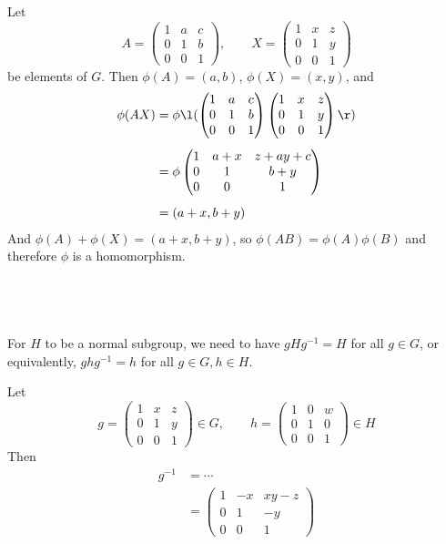 \documentclass[a4paper]{article}
\begin{document}
Let \[ A = \begin{pmatrix}
    1 & a & c \\
    0 & 1 & b \\
    0 & 0 & 1
\end{pmatrix}, \qquad
X = \begin{pmatrix}
    1 & x & z \\
    0 & 1 & y \\
    0 & 0 & 1
\end{pmatrix}
\] be elements of $G$. Then $\phi(A) = (a, b)$, $\phi(X) = (x, y)$, and
\begin{align*}
\phi(AX) &= \phi \l( \begin{pmatrix}
    1 & a & c \\
    0 & 1 & b \\
    0 & 0 & 1
\end{pmatrix}
\begin{pmatrix}
    1 & x & z \\
    0 & 1 & y \\
    0 & 0 & 1
\end{pmatrix} \r) \\[1ex]
&= \phi \begin{pmatrix}
    1 & a + x & z + ay + c \\
    0 & 1 & b + y \\
    0 & 0 & 1
\end{pmatrix} \\[1ex]
&= (a + x, b + y)%
\end{align*}
And $\phi(A) + \phi(X) = (a + x, b + y)$, so $\phi(AB) = \phi(A)\phi(B)$ and therefore $\phi$ is a homomorphism.

\subsection{~} %

For $H$ to be a normal subgroup, we need to have $gHg^{-1} = H$ for all $g \in G$, or equivalently, $ghg^{-1} = h$ for all $g \in G, h \in H$.

Let \[ g = \begin{pmatrix}
    1 & x & z \\
    0 & 1 & y \\
    0 & 0 & 1
\end{pmatrix} \in G, \qquad
h = \begin{pmatrix}
    1 & 0 & w \\
    0 & 1 & 0 \\
    0 & 0 & 1
\end{pmatrix} \in H
\]
Then
\begin{align*}
g^{-1} &= \cdots \\[1ex]
&= \begin{pmatrix}
    1 & -x & xy - z \\
    0 & 1 & -y \\
    0 & 0 & 1
\end{pmatrix}
\end{align*}
\end{document}
